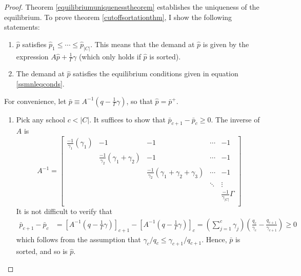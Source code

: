 \documentclass[12pt]{article}
\numberwithin{equation}{subsection}
\theoremstyle{definition}
\begin{document}
\begin{proof}
Theorem \ref{equilibriumuniquenesstheorem} establishes the uniqueness of the equilibrium. To prove theorem \ref{cutoffsortationthm}, I show the following statements:
\begin{enumerate}
\item $\hat p$ satisfies $\hat p_1 \leq \cdots \leq \hat p_{|C|}$. This means that the demand at $\hat p$ is given by the expression $A \hat p + \frac{1}{\Gamma}\gamma$ (which only holds if $\hat p$ is sorted).
\item The demand at $\hat p$ satisfies the equilibrium conditions given in equation \eqref{ssmnleqconds}.
\end{enumerate}

For convenience, let $\bar p \equiv A^{-1} (q - \frac{1}{\Gamma} \gamma) $, so that $\hat p = \bar p^+$. 
\begin{enumerate}
\item Pick any school $c < |C|$. It suffices to show that $\bar p_{c+1} - \bar p_{c} \geq 0$. The inverse of $A$ is
\begin{equation} \label{Ainv}
A^{-1} = \begin{bmatrix}
\frac{-1}{\gamma_1}\left( \gamma_1 \right) & -1 & -1 &\cdots & -1 \\
 & \frac{-1}{\gamma_2}\left( \gamma_1 + \gamma_2 \right) & -1 &\cdots & -1 \\
 & & \frac{-1}{\gamma_2}\left( \gamma_1 + \gamma_2 + \gamma_3 \right) &\cdots & -1 \\
 &  &  & \ddots & \vdots \\
 & & & &  \frac{-1}{\gamma_{|C|}} \Gamma \\
\end{bmatrix}
\end{equation}
It is not difficult to verify that
\begin{align} \label{barpissorted}
\bar p_{c+1} - \bar p_{c}
&= \left[A^{-1} (q - \frac{1}{\Gamma} \gamma) \right]_{c+1} - \left[A^{-1} (q - \frac{1}{\Gamma} \gamma) \right]_{c} = \left(\sum_{j=1}^c \gamma_j \right) \left(\frac{q_c}{\gamma_c} - \frac{q_{c+1}}{\gamma_{c+1}}\right) \geq 0
\end{align}
which follows from the assumption that $\gamma_c / q_c \leq \gamma_{c+1} / q_{c+1}$. Hence, $\bar p$ is sorted, and so is $\hat p$. 


\end{enumerate}
\end{proof}
\end{document}
